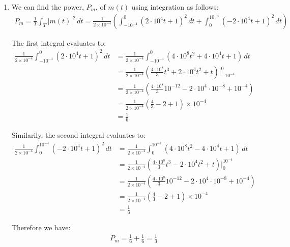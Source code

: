 \documentclass{article}
\begin{document}
\begin{enumerate}[label=3.\arabic*]
    \item We can find the power, $P_m$, of $m(t)$ using integration as follows:
    \begin{align*}
        P_m = \frac{1}{T} \int_{T} |m(t)|^2 \, dt = \frac{1}{2\times10^{-4}} \left(
            \int_{-10^{-4}}^{0} (2\cdot10^4t + 1)^2 \, dt + \int_{0}^{10^{-4}} (-2\cdot10^4t + 1)^2 \, dt
        \right)
    \end{align*}

    The first integral evaluates to:
    \begin{align*}
        \frac{1}{2\times 10^{-4}}\int_{-10^{-4}}^{0} (2\cdot10^4t + 1)^2 \, dt &= \frac{1}{2\times10^{-4}} \int_{-10^{-4}}^{0} (4\cdot10^8t^2 + 4\cdot10^4t + 1) \, dt \\
        &= \frac{1}{2\times10^{-4}} \left(\frac{4\cdot10^8}{3}t^3 + 2\cdot10^4t^2 + t\right)\Big|_{-10^{-4}}^{0} \\
        &= \frac{1}{2\times10^{-4}} \left(\frac{4\cdot10^8}{3}10^{-12} - 2\cdot10^4\cdot10^{-8} + 10^{-4}\right) \\
        &= \frac{1}{2\times10^{-4}} \left(\frac{4}{3} - 2 + 1 \right) \times 10^{-4} \\
        &= \frac{1}{6}
    \end{align*}

    Similarily, the second integral evaluates to:
    \begin{align*}
        \frac{1}{2\times 10^{-4}}\int_{0}^{10^{-4}} (-2\cdot10^4t + 1)^2 \, dt &= \frac{1}{2\times10^{-4}} \int_{0}^{10^{-4}} (4\cdot10^8t^2 - 4\cdot10^4t + 1) \, dt \\
        &= \frac{1}{2\times10^{-4}} \left(\frac{4\cdot10^8}{3}t^3 - 2\cdot10^4t^2 + t\right)\Big|_{0}^{10^{-4}} \\
        &= \frac{1}{2\times10^{-4}} \left(\frac{4\cdot10^8}{3}10^{-12} - 2\cdot10^4\cdot10^{-8} + 10^{-4}\right) \\
        &= \frac{1}{2\times10^{-4}} \left(\frac{4}{3} - 2 + 1 \right) \times 10^{-4} \\
        &= \frac{1}{6}
    \end{align*}

    Therefore we have:
    \begin{align*}
        P_m = \frac{1}{6} + \frac{1}{6} = \frac{1}{3}
    \end{align*}


\end{enumerate}
\end{document}
